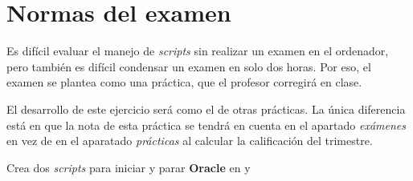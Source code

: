
\usepackage{eurosym}


\renewcommand{\hmwkClass}{Automatización de tareas}
\renewcommand{\hmwkTitle}{Examen de \textit{scripts} de \textit{shell}}


\usepackage{blindtext}








\primerapagina

\setlength{\parindent}{0em}
\setlength{\parskip}{1em}

\section{Normas del examen}
Es difícil evaluar el manejo de \textit{scripts} sin realizar un examen en el ordenador, pero también es difícil condensar un examen en solo dos horas. Por eso, el examen se plantea como una práctica, que el profesor corregirá en clase.

El desarrollo de este ejercicio será como el de otras prácticas. La única diferencia está en que la nota de esta práctica se tendrá en cuenta en el apartado \textit{exámenes} en vez de en el aparatado \textit{prácticas} al calcular la calificación del trimestre.


\begin{homeworkProblem}

  Crea dos \textit{scripts} para iniciar y parar \textbf{Oracle} en  y 
  
\end{homeworkProblem}

